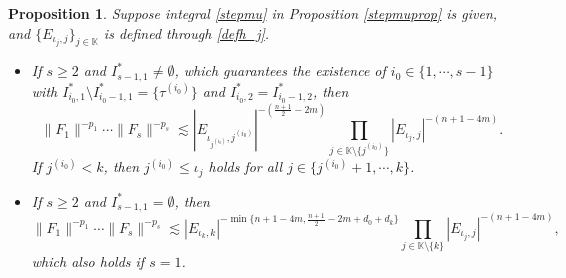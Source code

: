 \documentclass[11pt,reqno]{amsart}
\newtheorem{proposition}[theorem]{Proposition}
\numberwithin{equation}{section}
\theoremstyle{definition}
\begin{document}
\begin{proposition}\label{lmlinereduction}
	Suppose integral \eqref{stepmu} in Proposition \ref{stepmuprop} is given, and $\{E_{\iota_j,j}\}_{j\in\mathbb{K}}$ is defined through \eqref{defh_j}.
	\begin{itemize}
		\item [1)] If $s\geq2$ and $I_{s-1,1}^*\neq\emptyset$, which guarantees the existence of $i_0\in\{1,\cdots,s-1\}$ with $I_{i_0,1}^*\setminus I_{i_0-1,1}^*=\{\tau^{(i_0)}\}$ and $I_{i_0,2}^*=I_{i_0-1,2}^*$, then
		\begin{equation}\label{FE1}
			\|F_1\|^{-p_1}\cdots\|F_s\|^{-p_s}\lesssim|E_{\iota_{j^{(i_0)}},j^{(i_0)}}|^{-(\frac{n+1}{2}-2m)}\prod_{j\in\mathbb{K}\setminus\{j^{(i_0)}\}}|E_{\iota_j,j}|^{-(n+1-4m)}.
		\end{equation}
		If $j^{(i_0)}<k$, then $j^{(i_0)}\leq\iota_j$ holds for all $j\in\{j^{(i_0)}+1,\cdots,k\}$.
		
		\item [2)] If $s\geq2$ and $I_{s-1,1}^*=\emptyset$, then
		\begin{equation*}
			\|F_1\|^{-p_1}\cdots\|F_s\|^{-p_s}\lesssim|E_{\iota_k,k}|^{-\min\{n+1-4m,\frac{n+1}{2}-2m+d_0+d_k\}}\prod_{j\in\mathbb{K}\setminus\{k\}}|E_{\iota_j,j}|^{-(n+1-4m)},
		\end{equation*}
		which also holds if $s=1$.
	\end{itemize}
\end{proposition}
\end{document}
